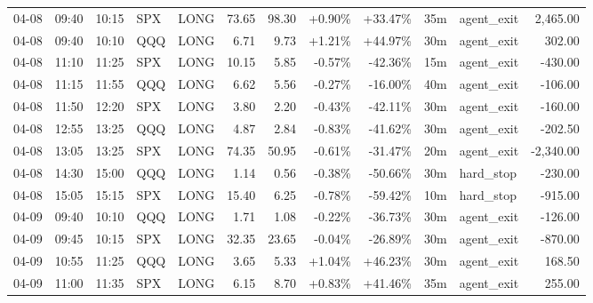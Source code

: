\documentclass[11pt,a4paper,twoside]{article}
\begin{document}
\begin{center}
\begin{longtable}{>{\color{txtmain}}l l l l l r r r r r >{\color{txtmain}}l r}
04-08 & 09:40 & 10:15 & SPX & LONG & 73.65 & 98.30 & \textcolor{wingreen}{+0.90\%} & \textcolor{wingreen}{+33.47\%} & 35m & agent\_exit & \textcolor{wingreen}{2,465.00} \\
04-08 & 09:40 & 10:10 & QQQ & LONG & 6.71 & 9.73 & \textcolor{wingreen}{+1.21\%} & \textcolor{wingreen}{+44.97\%} & 30m & agent\_exit & \textcolor{wingreen}{302.00} \\
04-08 & 11:10 & 11:25 & SPX & LONG & 10.15 & 5.85 & \textcolor{lossred}{-0.57\%} & \textcolor{lossred}{-42.36\%} & 15m & agent\_exit & \textcolor{lossred}{-430.00} \\
04-08 & 11:15 & 11:55 & QQQ & LONG & 6.62 & 5.56 & \textcolor{lossred}{-0.27\%} & \textcolor{lossred}{-16.00\%} & 40m & agent\_exit & \textcolor{lossred}{-106.00} \\
04-08 & 11:50 & 12:20 & SPX & LONG & 3.80 & 2.20 & \textcolor{lossred}{-0.43\%} & \textcolor{lossred}{-42.11\%} & 30m & agent\_exit & \textcolor{lossred}{-160.00} \\
04-08 & 12:55 & 13:25 & QQQ & LONG & 4.87 & 2.84 & \textcolor{lossred}{-0.83\%} & \textcolor{lossred}{-41.62\%} & 30m & agent\_exit & \textcolor{lossred}{-202.50} \\
04-08 & 13:05 & 13:25 & SPX & LONG & 74.35 & 50.95 & \textcolor{lossred}{-0.61\%} & \textcolor{lossred}{-31.47\%} & 20m & agent\_exit & \textcolor{lossred}{-2,340.00} \\
04-08 & 14:30 & 15:00 & QQQ & LONG & 1.14 & 0.56 & \textcolor{lossred}{-0.38\%} & \textcolor{lossred}{-50.66\%} & 30m & hard\_stop & \textcolor{lossred}{-230.00} \\
04-08 & 15:05 & 15:15 & SPX & LONG & 15.40 & 6.25 & \textcolor{lossred}{-0.78\%} & \textcolor{lossred}{-59.42\%} & 10m & hard\_stop & \textcolor{lossred}{-915.00} \\
04-09 & 09:40 & 10:10 & QQQ & LONG & 1.71 & 1.08 & \textcolor{lossred}{-0.22\%} & \textcolor{lossred}{-36.73\%} & 30m & agent\_exit & \textcolor{lossred}{-126.00} \\
04-09 & 09:45 & 10:15 & SPX & LONG & 32.35 & 23.65 & \textcolor{lossred}{-0.04\%} & \textcolor{lossred}{-26.89\%} & 30m & agent\_exit & \textcolor{lossred}{-870.00} \\
04-09 & 10:55 & 11:25 & QQQ & LONG & 3.65 & 5.33 & \textcolor{wingreen}{+1.04\%} & \textcolor{wingreen}{+46.23\%} & 30m & agent\_exit & \textcolor{wingreen}{168.50} \\
04-09 & 11:00 & 11:35 & SPX & LONG & 6.15 & 8.70 & \textcolor{wingreen}{+0.83\%} & \textcolor{wingreen}{+41.46\%} & 35m & agent\_exit & \textcolor{wingreen}{255.00} \\

\end{longtable}
\end{center}
\end{document}

